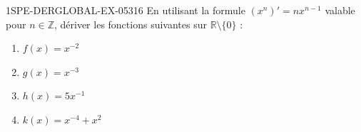 \begin{exercice}{1SPE-DERGLOBAL-EX-053}{1}{6}
En utilisant la formule $(x^n)' = nx^{n-1}$ valable pour $n \in \mathbb{Z}$, dériver les fonctions suivantes sur $\mathbb{R} \setminus \{0\}$ :
\begin{enumerate}
  \item $f(x) = x^{-2}$
  \item $g(x) = x^{-3}$
  \item $h(x) = 5x^{-1}$
  \item $k(x) = x^{-4} + x^2$
\end{enumerate}
\end{exercice}
